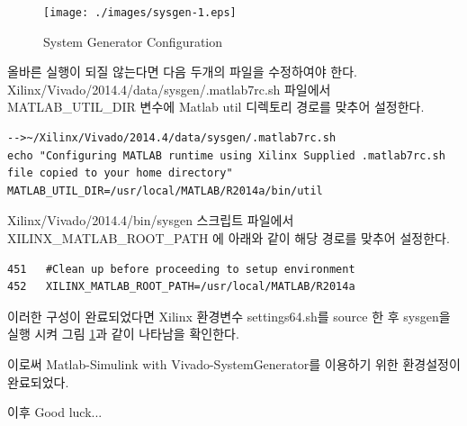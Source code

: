\documentclass[11pt
  , a4paper
  , article
  , oneside
]{memoir}
\begin{document}
\begin{figure}[h!]
	\centering
	\texttt{[image: ./images/sysgen-1.eps]}
	\caption{System Generator Configuration}
	\label{fig:sysgen_1} 
\end{figure}

올바른 실행이 되질 않는다면 다음 두개의 파일을 수정하여야 한다. \\
Xilinx/Vivado/2014.4/data/sysgen/.matlab7rc.sh 파일에서  MATLAB\_UTIL\_DIR 변수에 Matlab util 디렉토리 경로를 맞추어 설정한다.
\begin{lstlisting}[style=termstyle]
-->~/Xilinx/Vivado/2014.4/data/sysgen/.matlab7rc.sh
echo "Configuring MATLAB runtime using Xilinx Supplied .matlab7rc.sh file copied to your home directory"
MATLAB_UTIL_DIR=/usr/local/MATLAB/R2014a/bin/util
\end{lstlisting}

Xilinx/Vivado/2014.4/bin/sysgen 스크립트 파일에서 XILINX\_MATLAB\_ROOT\_PATH 에 아래와 같이 해당 경로를 맞추어 설정한다.

\begin{lstlisting}[style=termstyle]
451   #Clean up before proceeding to setup environment
452   XILINX_MATLAB_ROOT_PATH=/usr/local/MATLAB/R2014a
\end{lstlisting}

이러한 구성이 완료되었다면 Xilinx 환경변수 settings64.sh를 source 한 후 sysgen을 실행 시켜 그림 \ref{fig:sysgen_1}과 같이 나타남을 확인한다.

이로써 Matlab-Simulink with Vivado-SystemGenerator를 이용하기 위한 환경설정이 완료되었다.

이후 Good luck...


\clearpage


\end{document}
